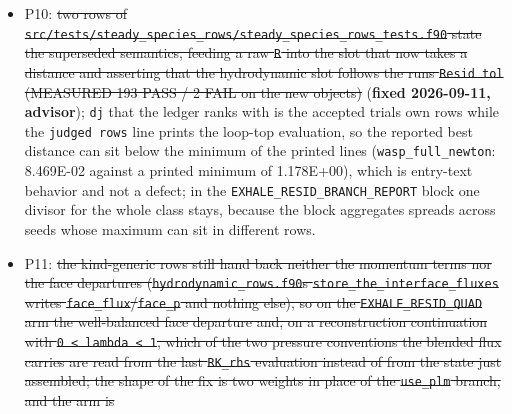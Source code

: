 \documentclass[english,a4paper]{my_memo}
\begin{document}
\begin{itemize}
  P9: \st{the \mbox{\texttt{Coupled\ carrier\ solve}} key comment in
  \mbox{\texttt{src/modules/files\_IO/input\_read.f90}} states that the alternation "was
  measured not to converge and not to be able to" (section 139). The first
  half is what P7 measured against: the alternation with the joint
  acceptance contract of P6 brings every elemental wind row of the atomic
  fixture inside 1e-5 and moves the carrier front monotonically, so the
  comment\textquotesingle s reading is at least narrower than it states. Not my file this
  increment; it needs the sentence rewritten to what section 139 actually
  measured (the old alternation, without the acceptance contract, and its
  sign error on the front\textquotesingle s motion).} (\textbf{fixed 2026-09-11, advisor}.)
\item
  P10: \st{two rows of
  \mbox{\texttt{src/tests/steady\_species\_rows/steady\_species\_rows\_tests.f90}} state the
  superseded semantics, feeding a raw \mbox{\texttt{\textbar{}\textbar{}R\textbar{}\textbar{}}} into the slot that now takes a
  distance and asserting that the hydrodynamic slot follows the run\textquotesingle s
  \mbox{\texttt{Resid\ tol}} (MEASURED 193 PASS / 2 FAIL on the new objects)} (\textbf{fixed
  2026-09-11, advisor}); \texttt{dj} that the ledger ranks with is the accepted
  trial\textquotesingle s own rows while the \texttt{judged\ rows} line prints the loop-top
  evaluation, so the reported best distance can sit below the minimum of the
  printed lines (\texttt{wasp\_full\_newton}: 8.469E-02 against a printed minimum of
  1.178E+00), which is entry-text behavior and not a defect; in the
  \texttt{EXHALE\_RESID\_BRANCH\_REPORT} block one divisor for the whole class stays,
  because the block aggregates spreads across seeds whose maximum can sit in
  different rows.
\item
  P11: \st{the kind-generic rows still hand back neither the momentum terms nor
  the face departures (\mbox{\texttt{hydrodynamic\_rows.f90}}\textquotesingle s
  \mbox{\texttt{store\_the\_interface\_fluxes}} writes \mbox{\texttt{face\_flux}}/\mbox{\texttt{face\_p}} and nothing
  else), so on the \mbox{\texttt{EXHALE\_RESID\_QUAD}} arm the well-balanced face departure
  and, on a reconstruction continuation with \mbox{\texttt{0\ \textless{}\ lambda\ \textless{}\ 1}}, which of the
  two pressure conventions the blended flux carries are read from the last
  \mbox{\texttt{RK\_rhs}} evaluation instead of from the state just assembled; the shape of
  the fix is two weights in place of the \mbox{\texttt{use\_plm}} branch, and the arm is
}
\end{itemize}
\end{document}
